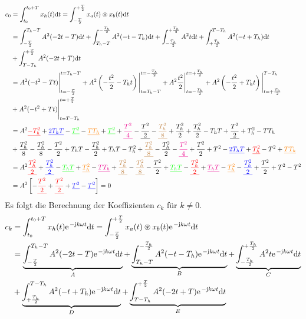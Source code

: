 \documentclass[11pt,a4paper,DIV=12]{scrartcl}
\newcommand{\ured}[1]{\textcolor{red}{\underline{#1}}}
\newcommand{\ublue}[1]{\textcolor{blue}{\underline{#1}}}
\newcommand{\ugreen}[1]{\textcolor{green}{\underline{#1}}}
\newcommand{\uorange}[1]{\textcolor{orange}{\underline{#1}}}
\newcommand{\umagenta}[1]{\textcolor{magenta}{\underline{#1}}}
\newcommand{\ublack}[1]{\textcolor{black}{\underline{#1}}}
\newcommand{\ubrown}[1]{\textcolor{brown}{\underline{#1}}}
\newcommand{\diff}{\mathrm{d}}
\begin{document}
\begin{align}
	c_0&=\int_{t_0}^{t_0+T}x_{h}(t)\diff t=
	\int_{-\frac{T}{2}}^{+\frac{T}{2}}x_{a}(t)\circledast x_{b}(t)\diff t \nonumber \\
	&=\int_{-\frac{T}{2}}^{T_h-T}A^2(-2t-T)\diff t+\int_{T_h-T}^{-\frac{T_h}{2}}A^2(-t-T_h)\diff t
	+\int_{-\frac{T_h}{2}}^{+\frac{T_h}{2}}A^2t\diff t
	+\int_{+\frac{T_h}{2}}^{T-T_h}A^2(-t+T_h)\diff t\nonumber \\
	&+\int_{T-T_h}^{+\frac{T}{2}}A^2(-2t+T)\diff t\nonumber \\
	&=A^2(-t^2-Tt)\Bigg |_{t=-\frac{T}{2}}^{t=T_h-T}
	+A^2\left(-\frac{t^2}{2}-T_ht\right)\Bigg |_{t=T_h-T}^{t=-\frac{T_h}{2}}
	+A^2\frac{t^2}{2}\Bigg |_{t=-\frac{T_h}{2}}^{t=+\frac{T_h}{2}}
	+A^2\left(-\frac{t^2}{2}+T_ht\right)\Bigg |_{t=+\frac{T_h}{2}}^{T-T_h}\nonumber \\
	&+A^2(-t^2+Tt)\Bigg |_{t=T-T_h}^{t=+\frac{T}{2}} \nonumber \\
	&=A^2 \ured{-T_h^2}+\ublue{2T_hT}-\ugreen{T^2}-\uorange{TT_h}+\ugreen{T^2}+\umagenta{\frac{T^2}{4}}-\ublack{\frac{T^2}{2}}-\ubrown{\frac{T_h^2}{8}}+\frac{T_h^2}{2}+\frac{T_h^2}{2}-T_hT+\ublack{\frac{T^2}{2}}+T_h^2-TT_h\nonumber \\
	&+\frac{T_h^2}{8}-\frac{T_h^2}{8}-\frac{T^2}{2}+T_hT-\frac{T_h^2}{2}+T_hT-T_h^2+\ubrown{\frac{T_h^2}{8}}-\frac{T_h^2}{2}-\umagenta{\frac{T^2}{4}}+\frac{T^2}{2}+T^2-\ublue{2T_hT}+\ured{T_h^2}-T^2+\uorange{TT_h}\nonumber \\
	&=A^2\ured{\frac{T_h^2}{2}}+\ublue{\frac{T_h^2}{2}}-\ugreen{T_hT}+\uorange{T_h^2}-\umagenta{TT_h}+\ubrown{\frac{T_h^2}{8}}-\ubrown{\frac{T_h^2}{8}}-\frac{T^2}{2}+\ugreen{T_hT}-\ured{\frac{T_h^2}{2}}+\umagenta{T_hT}-\uorange{T_h^2}-\ublue{\frac{T_h^2}{2}}+\frac{T^2}{2}+T^2-T^2 \nonumber \\
	&=A^2\left [-\ured{\frac{T^2}{2}}+\ured{\frac{T^2}{2}}+\ublue{T^2}-\ublue{T^2}\right] = 0
\end{align}
%
%
%
Es folgt die Berechnung der Koeffizienten $c_k$ für $k\neq 0$.
%
%
%
\begin{align}
	c_k&=\int_{t_0}^{t_0+T}x_{h}(t)\e^{-\im k \omega t}\diff t
	=\int_{-\frac{T}{2}}^{+\frac{T}{2}}x_{a}(t)\circledast x_{b}(t)\e^{-\im k \omega t}\diff t\nonumber \\
	&=\underbrace{\int_{-\frac{T}{2}}^{T_h-T}A^2(-2t-T)\e^{-\im k \omega t}\diff t}_A+\underbrace{\int_{T_h-T}^{-\frac{T_h}{2}}A^2(-t-T_h)\e^{-\im k \omega t}\diff t}_B+\underbrace{\int_{-\frac{T_h}{2}}^{+\frac{T_h}{2}}A^2t\e^{-\im k \omega t}\diff t}_C\nonumber \\
	&+\underbrace{\int_{+\frac{T_h}{2}}^{T-T_h}A^2(-t+T_h)\e^{-\im k \omega t}\diff t}_D +\underbrace{\int_{T-T_h}^{+\frac{T}{2}}A^2(-2t+T)\e^{-\im k \omega t}\diff t}_E
\end{align}
\end{document}
